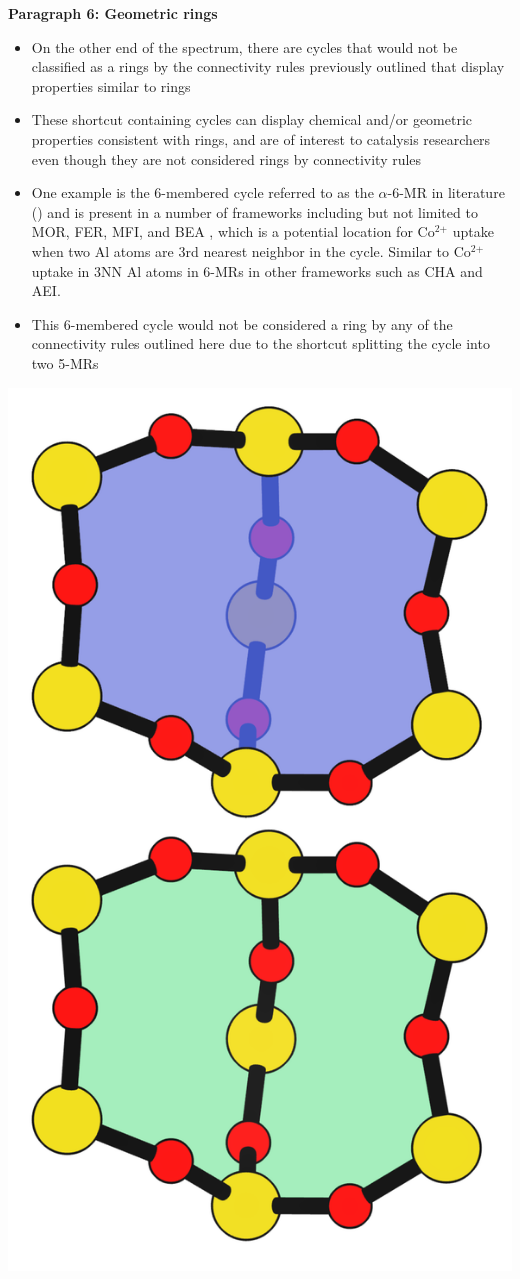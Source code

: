 \documentclass[11pt]{article}
\begin{document}
\textbf{\textbf{Paragraph 6: Geometric rings}}
\begin{itemize}
\item On the other end of the spectrum, there are cycles that would not be classified as a rings by the connectivity rules previously outlined that display properties similar to rings
\item These shortcut containing cycles can display chemical and/or geometric properties consistent with rings, and are of interest to catalysis researchers even though they are not considered rings by connectivity rules
\item One example is the 6-membered cycle referred to as the \(\alpha\)-6-MR in literature () and is present in a number of frameworks including but not limited to  MOR, FER, MFI, and BEA \cite{dedecek-siting-2012,bernauer-proton-2016}, which is a potential location for Co\(^{\text{2+}}\) uptake when two Al atoms are 3rd nearest neighbor in the cycle. Similar to Co\(^{\text{2+}}\) uptake in 3NN Al atoms in 6-MRs in other frameworks such as CHA and AEI.
\item This 6-membered cycle would not be considered a ring by any of the connectivity rules outlined here due to the shortcut splitting the cycle into two 5-MRs
\end{itemize}

\begin{center}
\includegraphics[width=.4\textwidth]{../figures/completed-figures/MFI-6MC.pdf}
\end{center}
\end{document}
